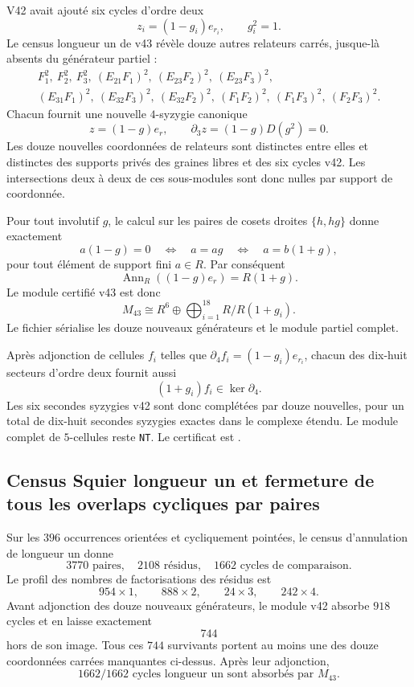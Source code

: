 \documentclass[11pt,a4paper]{article}
\newcommand{\certNT}{\texttt{NT}}
\begin{document}
V42 avait ajouté six cycles d'ordre deux
\[
 z_i=(1-g_i)e_{r_i},\qquad g_i^2=1.
\]
Le census longueur un de v43 révèle douze autres relateurs carrés, jusque-là absents du générateur partiel :
\[
\begin{gathered}
F_1^2,\ F_2^2,\ F_3^2,\ (E_{21}F_1)^2,\ (E_{23}F_2)^2,\ (E_{23}F_3)^2,\\
(E_{31}F_1)^2,\ (E_{32}F_3)^2,\ (E_{32}F_2)^2,
\ (F_1F_2)^2,\ (F_1F_3)^2,\ (F_2F_3)^2.
\end{gathered}
\]
Chacun fournit une nouvelle $4$-syzygie canonique
\[
 z=(1-g)e_r,
 \qquad
 \partial_3z=(1-g)D(g^2)=0.
\]
Les douze nouvelles coordonnées de relateurs sont distinctes entre elles et distinctes des supports privés des graines libres et des six cycles v42. Les intersections deux à deux de ces sous-modules sont donc nulles par support de coordonnée.

Pour tout involutif $g$, le calcul sur les paires de cosets droites $\{h,hg\}$ donne exactement
\[
 a(1-g)=0
 \quad\Longleftrightarrow\quad
 a=ag
 \quad\Longleftrightarrow\quad
 a=b(1+g),
\]
pour tout élément de support fini $a\in R$. Par conséquent
\[
 \boxed{\operatorname{Ann}_R((1-g)e_r)=R(1+g).}
\]
Le module certifié v43 est donc
\[
 \boxed{
 M_{43}\cong
 R^6\oplus\bigoplus_{i=1}^{18}R/R(1+g_i).}
\]
Le fichier  sérialise les douze nouveaux générateurs et  le module partiel complet.

Après adjonction de cellules $f_i$ telles que $\partial_4f_i=(1-g_i)e_{r_i}$, chacun des dix-huit secteurs d'ordre deux fournit aussi
\[
 (1+g_i)f_i\in\ker\partial_4.
\]
Les six secondes syzygies v42 sont donc complétées par douze nouvelles, pour un total de dix-huit secondes syzygies exactes dans le complexe étendu. Le module complet de $5$-cellules reste \certNT. Le certificat est .

\subsection{Census Squier longueur un et fermeture de tous les overlaps cycliques par paires}

Sur les $396$ occurrences orientées et cycliquement pointées, le census d'annulation de longueur un donne
\[
 \boxed{3770\text{ paires},\quad2108\text{ résidus},\quad1662\text{ cycles de comparaison}.}
\]
Le profil des nombres de factorisations des résidus est
\[
 954\times1,\qquad888\times2,\qquad24\times3,\qquad242\times4.
\]
Avant adjonction des douze nouveaux générateurs, le module v42 absorbe $918$ cycles et en laisse exactement
\[
 \boxed{744}
\]
hors de son image. Tous ces $744$ survivants portent au moins une des douze coordonnées carrées manquantes ci-dessus. Après leur adjonction,
\[
 \boxed{1662/1662\text{ cycles longueur un sont absorbés par }M_{43}.}
\]
\end{document}
